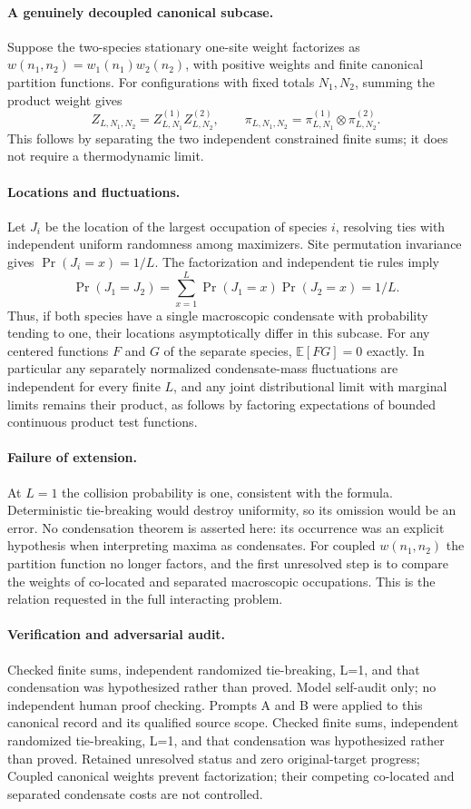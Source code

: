\documentclass[11pt]{article}
\begin{document}
\paragraph{A genuinely decoupled canonical subcase.} Suppose the two-species stationary one-site weight factorizes as $w(n_1,n_2)=w_1(n_1)w_2(n_2)$, with positive weights and finite canonical partition functions. For configurations with fixed totals $N_1,N_2$, summing the product weight gives
\[
 Z_{L,N_1,N_2}=Z^{(1)}_{L,N_1}Z^{(2)}_{L,N_2},\qquad
 \pi_{L,N_1,N_2}=\pi^{(1)}_{L,N_1}\otimes\pi^{(2)}_{L,N_2}.
\]
This follows by separating the two independent constrained finite sums; it does not require a thermodynamic limit.

\paragraph{Locations and fluctuations.} Let $J_i$ be the location of the largest occupation of species $i$, resolving ties with independent uniform randomness among maximizers. Site permutation invariance gives $\Pr(J_i=x)=1/L$. The factorization and independent tie rules imply
\[
 \Pr(J_1=J_2)=\sum_{x=1}^L\Pr(J_1=x)\Pr(J_2=x)=1/L.
\]
Thus, if both species have a single macroscopic condensate with probability tending to one, their locations asymptotically differ in this subcase. For any centered functions $F$ and $G$ of the separate species, $\mathbb E[F G]=0$ exactly. In particular any separately normalized condensate-mass fluctuations are independent for every finite $L$, and any joint distributional limit with marginal limits remains their product, as follows by factoring expectations of bounded continuous product test functions.

\paragraph{Failure of extension.} At $L=1$ the collision probability is one, consistent with the formula. Deterministic tie-breaking would destroy uniformity, so its omission would be an error. No condensation theorem is asserted here: its occurrence was an explicit hypothesis when interpreting maxima as condensates. For coupled $w(n_1,n_2)$ the partition function no longer factors, and the first unresolved step is to compare the weights of co-located and separated macroscopic occupations. This is the relation requested in the full interacting problem.

\paragraph{Verification and adversarial audit.}
Checked finite sums, independent randomized tie-breaking, L=1, and that condensation was hypothesized rather than proved. Model self-audit only; no independent human proof checking. Prompts A and B were applied to this canonical record and its qualified source scope. Checked finite sums, independent randomized tie-breaking, L=1, and that condensation was hypothesized rather than proved. Retained unresolved status and zero original-target progress; Coupled canonical weights prevent factorization; their competing co-located and separated condensate costs are not controlled.
\end{document}
